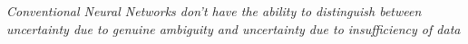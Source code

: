 \documentclass[preview]{standalone}
\begin{document}
\begin{center}
\textit{Conventional Neural Networks don't have the ability to distinguish between }\textit{uncertainty due to genuine ambiguity and uncertainty due to insufficiency of data}
\end{center}
\end{document}
